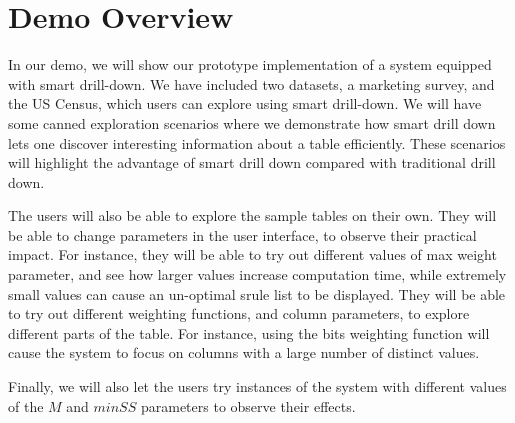 
\section{Demo Overview} \label{sec:demo} 
In our demo, we will show our prototype implementation of a system equipped with smart drill-down. We have included two datasets, a marketing survey, and the US Census, which users can explore using smart drill-down. We will have some canned exploration scenarios where we demonstrate how smart drill down lets one discover interesting information about a table efficiently. These scenarios will highlight the advantage of smart drill down compared with traditional drill down. 

The users will also be able to explore the sample tables on their own. They will be able to change parameters in the user interface, to observe their practical impact. For instance, they will be able to try out different values of max weight parameter, and see how larger values increase computation time, while extremely small values can cause an un-optimal srule list to be displayed. They will be able to try out different weighting functions, and column parameters, to explore different parts of the table. For instance, using the bits weighting function will cause the system to focus on columns with a large number of distinct values. 

Finally, we will also let the users try instances of the system with different values of the $M$ and $minSS$ parameters to observe their effects. 

